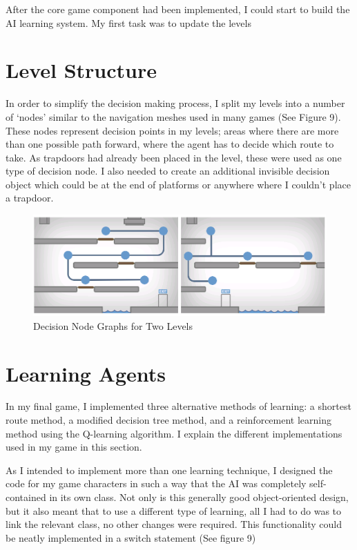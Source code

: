 \documentclass[a4paper,oneside]{report}
\begin{document}
After the core game component had been implemented, I could start to build the AI learning system. My first task was to update the levels 

\section{Level Structure}

In order to simplify the decision making process, I split my levels into a number of `nodes' similar to the navigation meshes used in many games (See Figure 9). These nodes represent decision points in my levels; areas where there are more than one possible path forward, where the agent has to decide which route to take. As trapdoors had already been placed in the level, these were used as one type of decision node. I also needed to create an additional invisible decision object which could be at the end of platforms or anywhere where I couldn't place a trapdoor. 

\begin{figure}[h!]
  \centering
    \includegraphics[width=140mm]{sources/images/LevelNodes}
    \caption{Decision Node Graphs for Two Levels}
\end{figure}

\section{Learning Agents}

In my final game, I implemented three alternative methods of learning: a shortest route method, a modified decision tree method, and a reinforcement learning method using the Q-learning algorithm. I explain the different implementations used in my game in this section.

As I intended to implement more than one learning technique, I designed the code for my game characters in such a way that the AI was completely self-contained in its own class. Not only is this generally good object-oriented design, but it also meant that to use a different type of learning, all I had to do was to link the relevant class, no other changes were required. This functionality could be neatly implemented in a switch statement (See figure 9)
\end{document}
